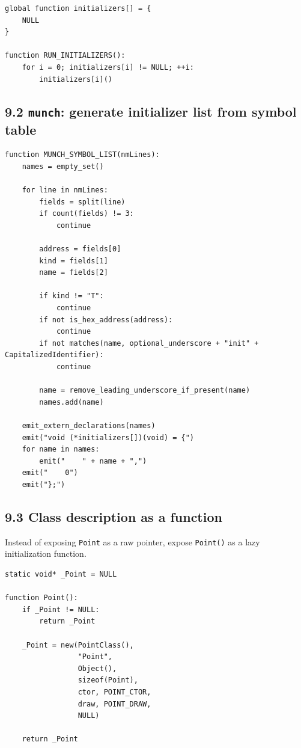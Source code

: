 \documentclass[11pt]{article}
\begin{document}
\begin{verbatim}
global function initializers[] = {
    NULL
}

function RUN_INITIALIZERS():
    for i = 0; initializers[i] != NULL; ++i:
        initializers[i]()
\end{verbatim}

\subsection{\texorpdfstring{9.2 \texttt{munch}: generate initializer
list from symbol
table}{9.2 munch: generate initializer list from symbol table}}\label{munch-generate-initializer-list-from-symbol-table}

\begin{verbatim}
function MUNCH_SYMBOL_LIST(nmLines):
    names = empty_set()

    for line in nmLines:
        fields = split(line)
        if count(fields) != 3:
            continue

        address = fields[0]
        kind = fields[1]
        name = fields[2]

        if kind != "T":
            continue
        if not is_hex_address(address):
            continue
        if not matches(name, optional_underscore + "init" + CapitalizedIdentifier):
            continue

        name = remove_leading_underscore_if_present(name)
        names.add(name)

    emit_extern_declarations(names)
    emit("void (*initializers[])(void) = {")
    for name in names:
        emit("    " + name + ",")
    emit("    0")
    emit("};")
\end{verbatim}

\subsection{9.3 Class description as a
function}\label{class-description-as-a-function}

Instead of exposing \texttt{Point} as a raw pointer,
expose \texttt{Point()} as a lazy initialization
function.

\begin{verbatim}
static void* _Point = NULL

function Point():
    if _Point != NULL:
        return _Point

    _Point = new(PointClass(),
                 "Point",
                 Object(),
                 sizeof(Point),
                 ctor, POINT_CTOR,
                 draw, POINT_DRAW,
                 NULL)

    return _Point
\end{verbatim}
\end{document}
